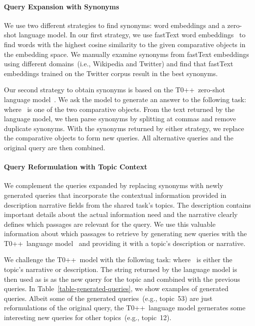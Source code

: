\paragraph{Query Expansion with Synonyms}

We use two different strategies to find synonyms: \Ni word embeddings and \Nii a zero-shot language model.
In our first strategy, we use fastText word embeddings~\cite{BojanowskiGJM2017} to find words with the highest cosine similarity to the given comparative objects in the embedding space.
We manually examine synonyms from fastText embeddings using different domains~(i.e., Wikipedia and Twitter) and find that fastText embeddings trained on the Twitter corpus result in the best synonyms.

Our second strategy to obtain synonyms is based on the T0++~zero-shot language model~\cite{SanhWRBSACSLRDBXTSSKCNDCJWMSYPBWNRSSFFTBGBWR2021}.
We ask the model to generate an answer to the following task:  where ~is one of the two comparative objects.
From the text returned by the language model, we then parse synonyms by splitting at commas and remove duplicate synonyms.
With the synonyms returned by either strategy, we replace the comparative objects to form new queries. All alternative queries and the original query are then combined.

\paragraph{Query Reformulation with Topic Context}


We complement the queries expanded by replacing synonyms with newly generated queries that incorporate the contextual information provided in description narrative fields from the shared task's topics.
The description contains important details about the actual information need and the narrative clearly defines which passages are relevant for the query.
We use this valuable information about which passages to retrieve by generating new queries with the T0++~language model~\cite{SanhWRBSACSLRDBXTSSKCNDCJWMSYPBWNRSSFFTBGBWR2021} and providing it with a topic's description or narrative.

We challenge the T0++~model with the following task:  where ~is either the topic's narrative or description.
The string returned by the language model is then used as is as the new query for the topic and combined with the previous queries.
In Table~\ref{table-generated-queries}, we show examples of generated queries.
Albeit some of the generated queries~(e.g., topic~53) are just reformulations of the original query, the T0++~language model gernerates some interesting new queries for other topics~(e.g., topic~12).

